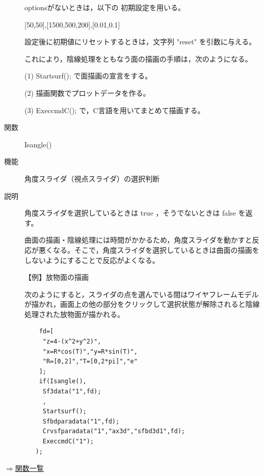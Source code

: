 \documentclass[papersize,a4paper,12pt,uplatex]{jsarticle}
\begin{document}
\begin{description}
optionsがないときは，以下の 初期設定を用いる。

   [50,50],[1500,500,200],[0.01,0.1]

設定後に初期値にリセットするときは，文字列 "reset" を引数に与える。

これにより，陰線処理をともなう面の描画の手順は，次のようになる。

(1)  Startsurf(); で面描画の宣言をする。

(2) 描画関数でプロットデータを作る。

(3) ExeccmdC(); で，C言語を用いてまとめて描画する。


\vspace{\baselineskip}
\hypertarget{isangle}{}
\item[関数]  Isangle()
\item[機能]  角度スライダ（視点スライダ）の選択判断
\item[説明]  角度スライダを選択しているときは true ，そうでないときは false を返す。

曲面の描画・陰線処理には時間がかかるため，角度スライダを動かすと反応が悪くなる。そこで，角度スライダを選択しているときは曲面の描画をしないようにすることで反応がよくなる。

\vspace{\baselineskip}
【例】放物面の描画

次のようにすると，スライダの点を選んでいる間はワイヤフレームモデルが描かれ，画面上の他の部分をクリックして選択状態が解除されると陰線処理された放物面が描かれる。
\begin{verbatim}
    fd=[
     "z=4-(x^2+y^2)",
     "x=R*cos(T)","y=R*sin(T)",
     "R=[0,2]","T=[0,2*pi]","e"
    ];
    if(Isangle(),
     Sf3data("1",fd);
     ,
     Startsurf();
     Sfbdparadata("1",fd);
     Crvsfparadata("1","ax3d","sfbd3d1",fd);
     ExeccmdC("1");
   );
\end{verbatim}

\end{description}

\begin{flushright} \hyperlink{functionlist}{$\Rightarrow$関数一覧}\end{flushright}

\newpage
\end{document}
